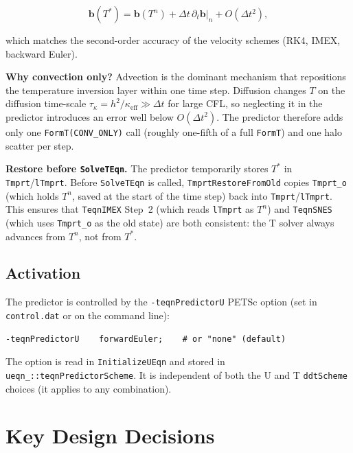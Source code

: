 \documentclass[12pt,a4paper]{article}
\begin{document}
\begin{equation}
  \mathbf{b}(T^*) = \mathbf{b}(T^n) + \Delta t\,\partial_t\mathbf{b}\big|_n
  + O(\Delta t^2),
\end{equation}

which matches the second-order accuracy of the velocity schemes (RK4, IMEX,
backward Euler).

\textbf{Why convection only?}
Advection is the dominant mechanism that repositions the temperature inversion
layer within one time step.
Diffusion changes $T$ on the diffusion time-scale
$\tau_\kappa = h^2/\kappa_{\text{eff}} \gg \Delta t$ for large CFL, so
neglecting it in the predictor introduces an error well below $O(\Delta t^2)$.
The predictor therefore adds only one \texttt{FormT(CONV\_ONLY)} call
(roughly one-fifth of a full \texttt{FormT}) and one halo scatter per step.

\textbf{Restore before \texttt{SolveTEqn}.}
The predictor temporarily stores $T^*$ in \texttt{Tmprt}/\texttt{lTmprt}.
Before \texttt{SolveTEqn} is called, \texttt{TmprtRestoreFromOld} copies
\texttt{Tmprt\_o} (which holds $T^n$, saved at the start of the time step)
back into \texttt{Tmprt}/\texttt{lTmprt}.  This ensures that \texttt{TeqnIMEX}
Step~2 (which reads \texttt{lTmprt} as $T^n$) and \texttt{TeqnSNES} (which
uses \texttt{Tmprt\_o} as the old state) are both consistent: the T solver
always advances from $T^n$, not from $T^*$.

\subsection*{Activation}

The predictor is controlled by the \texttt{-teqnPredictorU} PETSc option
(set in \texttt{control.dat} or on the command line):

\begin{lstlisting}[language={}]
-teqnPredictorU    forwardEuler;    # or "none" (default)
\end{lstlisting}

The option is read in \texttt{InitializeUEqn} and stored in
\texttt{ueqn\_::teqnPredictorScheme}.  It is independent of both the U and T
\texttt{ddtScheme} choices (it applies to any combination).

\section{Key Design Decisions}
\label{sec:teqn-design}
\end{document}
